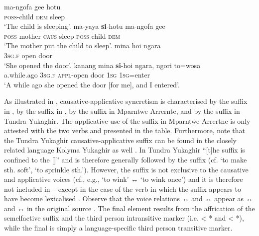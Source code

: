 \ea {} \citep[130ff.]{hayami-allen:2001}
\ea\label{ex:Ternate:sleep:a}
	\gll	ma-ngofa gee hotu \\
			\textsc{poss}-child \textsc{dem} sleep \\
	\glt	‘The child is sleeping’.
\ex\label{ex:Ternate:sleep:b}
	\gll	ma-yaya \textbf{si}-hotu ma-ngofa gee \\
			\textsc{poss}-mother \textsc{caus}-sleep \textsc{poss}-child \textsc{dem} \\
	\glt	‘The mother put the child to sleep’.
\ex\label{ex:Ternate:open:a}
	\gll	mina hoi ngara \\
			\textsc{3sg.f} open door \\
	\glt	‘She opened the door’.
\ex\label{ex:Ternate:open:b}
	\gll	kanang mina \textbf{si}-hoi ngara, ngori to=wosa \\
			a.while.ago \textsc{3sg.f} \textsc{appl}-open door \textsc{1sg} \textsc{1sg}=enter \\
	\glt	‘A while ago she opened the door [for me], and I entered’.
	\z 
\z

As illustrated in , causative-applicative syncretism is characterised by the suffix  in , by the suffix  in , by the suffix  in Mparntwe Arrernte, and by the suffix  in Tundra Yukaghir. The applicative use of the suffix  in Mparntwe Arrertne is only attested with the two verbs  and  presented in the table. Furthermore, note that the Tundra Yukaghir causative-applicative suffix  can be found in the closely related language Kolyma Yukaghir as well \citep[224]{maslova:2003}. In Tundra Yukaghir “[t]he suffix is confined to the  []” \citep[160]{schmalz:2013} and is therefore generally followed by the  suffix  (cf.  ‘to make sth. soft’,  ‘to sprinkle sth.’). However, the  suffix is not exclusive to the causative and applicative voices (cf., e.g.,  ‘to wink’ ↔  ‘to wink once’) and it is therefore not included in  -- except in the case of the verb  in which the  suffix appears to have become lexicalised \citep[28, 153]{schmalz:2013}. Observe that the voice relations  ↔  and  ↔  appear as  ↔  and  ↔  in the original source \citep[160]{schmalz:2013}. The final element  results from the affrication \citep[54]{schmalz:2013} of the semelfactive suffix  and the third person intransitive marker  (i.e.  < * and  < *), while the final  is simply a language-specific third person transitive marker.


